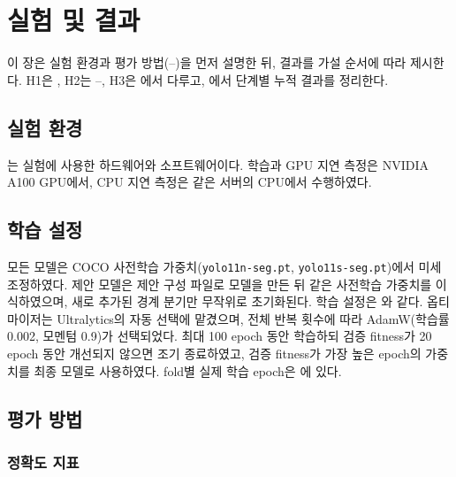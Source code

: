 \chapter{실험 및 결과}\label{ch:experiments}

이 장은 실험 환경과 평가 방법(--)을 먼저 설명한 뒤, 결과를 가설 순서에
따라 제시한다. H1은 , H2는 --,
H3은 에서 다루고, 에서 단계별 누적 결과를 정리한다.

\section{실험 환경}\label{sec:exp_env}

는 실험에 사용한 하드웨어와 소프트웨어이다. 학습과 GPU 지연 측정은 NVIDIA A100 GPU에서,
CPU 지연 측정은 같은 서버의 CPU에서 수행하였다.



\section{학습 설정}\label{sec:exp_train}

모든 모델은 COCO 사전학습 가중치(\texttt{yolo11n-seg.pt}, \texttt{yolo11s-seg.pt})에서 미세 조정하였다.
제안 모델은 제안 구성 파일로 모델을 만든 뒤 같은 사전학습 가중치를 이식하였으며, 새로 추가된 경계 분기만
무작위로 초기화된다. 학습 설정은 와 같다. 옵티마이저는 Ultralytics의 자동 선택에 맡겼으며,
전체 반복 횟수에 따라 AdamW(학습률 0.002, 모멘텀 0.9)가 선택되었다. 최대 100 epoch 동안 학습하되 검증 fitness가
20 epoch 동안 개선되지 않으면 조기 종료하였고, 검증 fitness가 가장 높은 epoch의 가중치를 최종 모델로 사용하였다.
fold별 실제 학습 epoch은 에 있다.



\section{평가 방법}\label{sec:exp_eval}

\subsection{정확도 지표}

